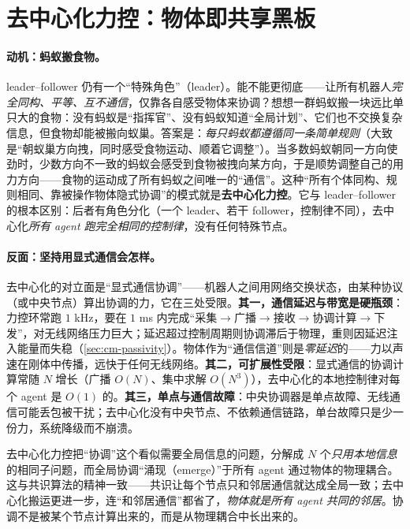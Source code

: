 \section{去中心化力控：物体即共享黑板}
\label{sec:cm-decentral}

\paragraph{动机：蚂蚁搬食物。}
leader--follower 仍有一个“特殊角色”（leader）。能不能更彻底——让所有机器人\emph{完全同构、平等、互不通信}，仅靠各自感受物体来协调？想想一群蚂蚁搬一块远比单只大的食物：没有蚂蚁是“指挥官”、没有蚂蚁知道“全局计划”、它们也不交换复杂信息，但食物却能被搬向蚁巢。答案是：\emph{每只蚂蚁都遵循同一条简单规则}（大致是“朝蚁巢方向拽，同时感受食物运动、顺着它调整”）。当多数蚂蚁朝同一方向使劲时，少数方向不一致的蚂蚁会感受到食物被拽向某方向，于是顺势调整自己的用力方向——食物的运动成了所有蚂蚁之间唯一的“通信”。这种“所有个体同构、规则相同、靠被操作物体隐式协调”的模式就是\textbf{去中心化力控}。它与 leader--follower 的根本区别：后者有角色分化（一个 leader、若干 follower，控制律不同），去中心化\emph{所有 agent 跑完全相同的控制律}，没有任何特殊节点。

\paragraph{反面：坚持用显式通信会怎样。}
去中心化的对立面是“显式通信协调”——机器人之间用网络交换状态，由某种协议（或中央节点）算出协调的力，它在三处受限。\textbf{其一，通信延迟与带宽是硬瓶颈}：力控环常跑 $1$ kHz，要在 $1$ ms 内完成“采集$\to$广播$\to$接收$\to$协调计算$\to$下发”，对无线网络压力巨大；延迟超过控制周期则协调滞后于物理，重则因延迟注入能量而失稳（\cref{sec:cm-passivity}）。物体作为“通信信道”则是\emph{零延迟}的——力以声速在刚体中传播，远快于任何无线网络。\textbf{其二，可扩展性受限}：显式通信的协调计算常随 $N$ 增长（广播 $O(N)$、集中求解 $O(N^3)$），去中心化的本地控制律对每个 agent 是 $O(1)$ 的。\textbf{其三，单点与通信故障}：中央协调器是单点故障、无线通信可能丢包被干扰；去中心化没有中央节点、不依赖通信链路，单台故障只是少一份力，系统降级而不崩溃。

\begin{insight}[协调“涌现”于物理耦合]
去中心化力控把“协调”这个看似需要全局信息的问题，分解成 $N$ 个\emph{只用本地信息}的相同子问题，而全局协调“涌现（emerge）”于所有 agent 通过物体的物理耦合。这与共识算法的精神一致——共识让每个节点只和邻居通信就达成全局一致；去中心化搬运更进一步，连“和邻居通信”都省了，\emph{物体就是所有 agent 共同的邻居}。协调不是被某个节点计算出来的，而是从物理耦合中长出来的。
\end{insight}


